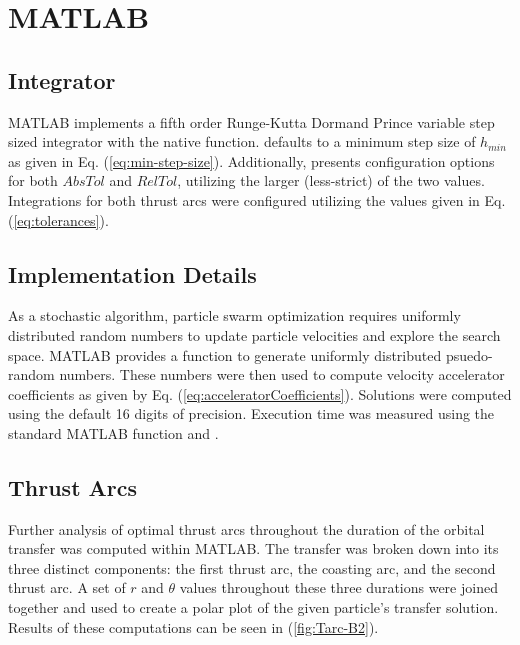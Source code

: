\section{MATLAB}

\subsection{Integrator}

\noindent MATLAB implements a fifth order Runge-Kutta Dormand Prince variable step sized integrator with the native  function. 
defaults to a minimum step size of $h_{min}$ as given in Eq. (\ref{eq:min-step-size}). Additionally, 
presents configuration options for both $AbsTol$ and $RelTol$, utilizing the larger (less-strict) of the two values. 
Integrations for both thrust arcs were configured utilizing the values given in Eq. (\ref{eq:tolerances}).

\subsection{Implementation Details}

\noindent As a stochastic algorithm, particle swarm optimization requires uniformly distributed random numbers to update particle velocities 
and explore the search space. MATLAB provides a  function to generate uniformly distributed
psuedo-random numbers. These numbers were then used to compute velocity accelerator coefficients as given by Eq. (\ref{eq:acceleratorCoefficients}).
Solutions were computed using the default 16 digits of precision. Execution time was measured using the standard MATLAB
function  and .


\subsection{Thrust Arcs}

\noindent Further analysis of optimal thrust arcs throughout the duration of the orbital transfer was computed within MATLAB.
The transfer was broken down into its three distinct components: the first thrust arc, the coasting arc, and the second thrust arc. 
A set of $r$ and $\theta$ values throughout these three durations were joined together and used to create a polar plot of the given particle's transfer
solution. Results of these computations can be seen in (\ref{fig:Tarc-B2}). \newline

